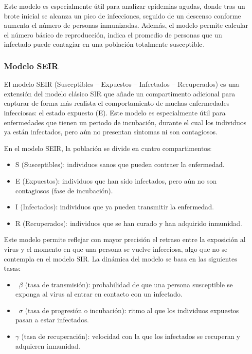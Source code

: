 \begin{enumerate}
Este modelo es especialmente útil para analizar epidemias agudas, donde tras un brote inicial se alcanza un pico de infecciones, seguido de un descenso conforme aumenta el número de personas inmunizadas. Además, el modelo permite calcular el número básico de reproducción, indica el promedio de personas que un infectado puede contagiar en una población totalmente susceptible.


\subsubsection*{Modelo SEIR}
El modelo SEIR (Susceptibles – Expuestos – Infectados – Recuperados) es una extensión del modelo clásico SIR que añade un compartimento adicional para capturar de forma más realista el comportamiento de muchas enfermedades infecciosas: el estado expuesto (E). Este modelo es especialmente útil para enfermedades que tienen un periodo de incubación, durante el cual los individuos ya están infectados, pero aún no presentan síntomas ni son contagiosos. 

En el modelo SEIR, la población se divide en cuatro compartimentos:
\begin{itemize}
    \item S (Susceptibles): individuos sanos que pueden contraer la enfermedad.
    \item E (Expuestos): individuos que han sido infectados, pero aún no son contagiosos (fase de incubación).
    \item I (Infectados): individuos que ya pueden transmitir la enfermedad.
    \item R (Recuperados): individuos que se han curado y han adquirido inmunidad.
\end{itemize}
	
Este modelo permite reflejar con mayor precisión el retraso entre la exposición al virus y el momento en que una persona se vuelve infecciosa, algo que no se contempla en el modelo SIR. La dinámica del modelo se basa en las siguientes tasas:
\begin{itemize}
    \item ~$\beta$ (tasa de transmisión): probabilidad de que una persona susceptible se exponga al virus al entrar en contacto con un infectado.
    \item ~$\sigma$ (tasa de progresión o incubación): ritmo al que los individuos expuestos pasan a estar infectados.
    \item $\gamma$ (tasa de recuperación): velocidad con la que los infectados se recuperan y adquieren inmunidad.
\end{itemize}


\end{enumerate}
